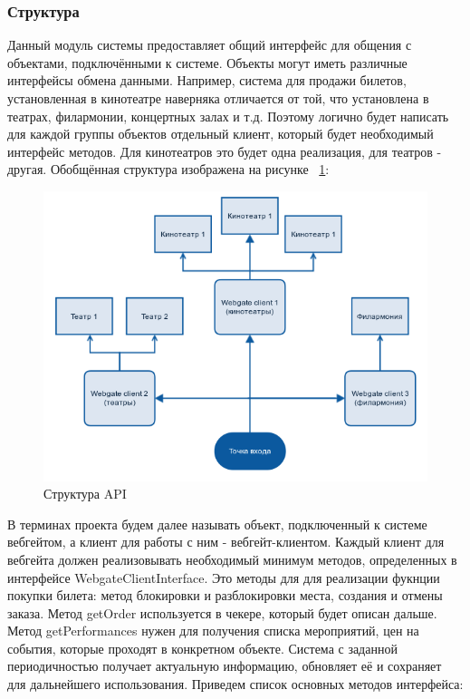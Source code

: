 \subsubsection{Структура}

Данный модуль системы предоставляет общий интерфейс для общения с объектами, подключёнными к системе. Объекты могут иметь различные интерфейсы обмена данными. Например, система для продажи билетов, установленная в кинотеатре наверняка отличается от той, что установлена в театрах, филармонии, концертных залах и т.д. Поэтому логично будет написать для каждой группы объектов отдельный клиент, который будет необходимый интерфейс методов. Для кинотеатров это будет одна реализация, для театров - другая. Обобщённая структура изображена на рисунке ~\ref{fig:api-struct}:

\begin{figure}[H]
  	\centering
 	\includegraphics[width=1\textwidth]{images/api-struct.png}
  	\caption{Структура API}
    \label{fig:api-struct}
\end{figure}


В терминах проекта будем далее называть объект, подключенный к системе вебгейтом, а клиент для работы с ним - вебгейт-клиентом. Каждый клиент для вебгейта должен реализовывать необходимый минимум методов, определенных в интерфейсе WebgateClientInterface. Это методы для для реализации фукнции покупки билета: метод блокировки и разблокировки места, создания и отмены заказа. Метод getOrder используется в чекере, который будет описан дальше. Метод getPerformances нужен для получения списка мероприятий, цен на события, которые проходят в конкретном объекте. Система с заданной периодичностью получает актуальную информацию, обновляет её и сохраняет для дальнейшего использования. Приведем список основных методов интерфейса:


